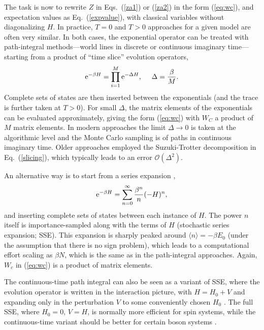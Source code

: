 \documentclass[range]{ar2e}
\begin{document}
The task is now to rewrite $Z$ in Eqs.~(\ref{za1}) or (\ref{za2}) in the form (\ref{eq:wc}), and expectation values as Eq.~(\ref{expvalue}), with classical variables 
without diagonalizing $H$. In practice, $T=0$ and $T>0$ approaches for a given model are often very similar. In both cases, the exponential 
operator can be treated with path-integral methods---world lines in discrete \cite{Suzuki77,Hirsch82} or continuous \cite{Beard96,Prokofev96,Prokofev98} 
imaginary time---starting from a product of ``time slice'' evolution operators,
\begin{equation}
{\rm e}^{-\beta H}= \prod_{i=1}^M {\rm e}^{-\Delta H},~~~~ \Delta=\frac{\beta}{M}.
\label{slicing}
\end{equation}
Complete sets of states are then inserted between the exponentials (and the trace is further taken at $T>0$). For small $\Delta$, the
matrix elements of the exponentials can be evaluated approximately, giving the form (\ref{eq:wc}) with $W_C$ a product of $M$ matrix elements. 
In modern approaches the limit $\Delta \to 0$ is taken at the algorithmic level \cite{Prokofev96,WormA,Beard96} and the Monte Carlo sampling is of 
paths in continuous imaginary time. Older approaches employed the Suzuki-Trotter decomposition \cite{Suzuki76} in Eq.~(\ref{slicing}), which 
typically leads to an error $\mathcal{O}(\Delta^2)$.

An alternative way is to start from a series expansion \cite{Handscomb62,Sandvik91},
\begin{equation}
{\rm e}^{-\beta H}= \sum_{n=0}^\infty \frac{\beta^n}{n}(-H)^n,
\label{series}
\end{equation}
and inserting complete sets of states between each instance of $H$. The power $n$ itself is importance-sampled along with the terms of $H$ 
(stochastic series expansion; SSE). This expansion is sharply peaked around $\langle n\rangle = -\beta E_0$ (under the assumption that there 
is no sign problem), which leads to a computational effort scaling as $\beta N$, which is the same as in the path-integral approaches. Again, $W_c$ 
in (\ref{eq:wc}) is a product of matrix elements. 

The continuous-time path integral can also be seen as a variant of SSE, where the evolution operator is written in the interaction picture, 
with $H=H_0+V$ and expanding only in the perturbation $V$ to some conveniently chosen $H_0$ \cite{Prokofev96,Sandvik97a}. The full SSE, where $H_0=0$, $V=H$, 
is normally more efficient for spin systems, while the continuous-time variant should be better for certain boson systems \cite{Troyer03}.
\end{document}
